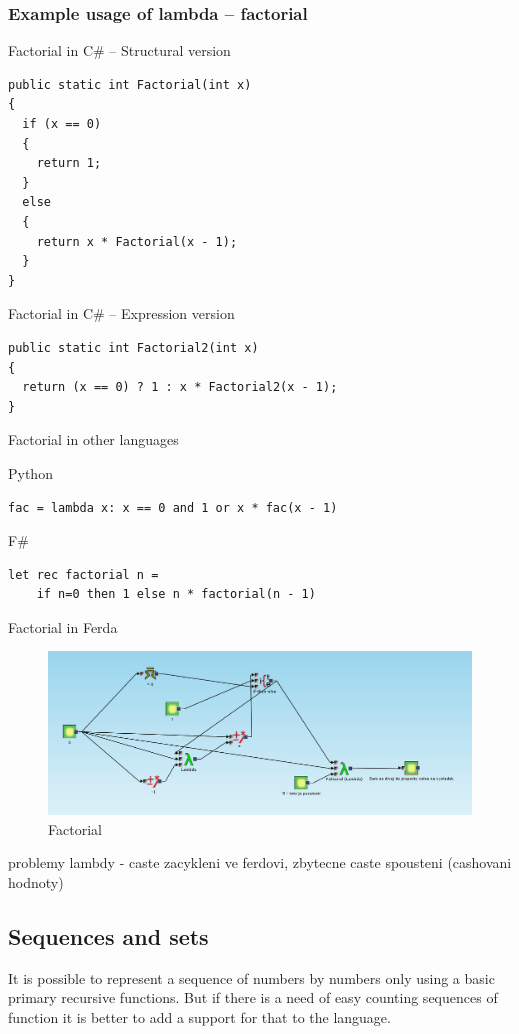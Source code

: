 \documentclass[a4paper,12pt]{book}
\begin{document}
\subsubsection{Example usage of lambda -- factorial}
Factorial in C\# -- Structural version

\begin{verbatim}
public static int Factorial(int x)
{
  if (x == 0)
  {
    return 1;
  }
  else
  {
    return x * Factorial(x - 1);
  }
}
\end{verbatim}
	
Factorial in C\# -- Expression version

\begin{verbatim}
public static int Factorial2(int x)
{
  return (x == 0) ? 1 : x * Factorial2(x - 1);
}
\end{verbatim}

Factorial in other languages

Python
\begin{verbatim}
fac = lambda x: x == 0 and 1 or x * fac(x - 1)
\end{verbatim}

F\#
\begin{verbatim}
let rec factorial n =
    if n=0 then 1 else n * factorial(n - 1)
\end{verbatim}
	
Factorial in Ferda
\begin{figure}
\includegraphics[width=13.72cm]{faktorial}
	\caption{Factorial}
\end{figure}

problemy lambdy - caste zacykleni ve ferdovi, zbytecne caste spousteni (cashovani hodnoty)

\subsection{Sequences and sets}
It is possible to represent a sequence of numbers by numbers only using a basic primary recursive functions. But if there is a need of easy counting sequences of function it is better to add a support for that to the language.
\end{document}
